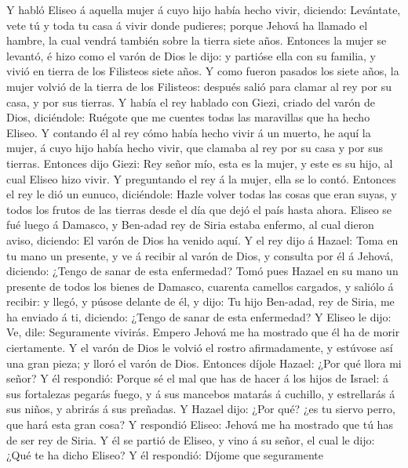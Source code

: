  Y habló Eliseo á aquella mujer á cuyo hijo había hecho
vivir, diciendo: Levántate, vete tú y toda tu casa á vivir donde
pudieres; porque Jehová ha llamado el hambre, la cual vendrá también
sobre la tierra siete años.  Entonces la mujer se levantó, é
hizo como el varón de Dios le dijo: y partióse ella con su familia, y
vivió en tierra de los Filisteos siete años.  Y como fueron
pasados los siete años, la mujer volvió de la tierra de los Filisteos:
después salió para clamar al rey por su casa, y por sus tierras.
 Y había el rey hablado con Giezi, criado del varón de Dios,
diciéndole: Ruégote que me cuentes todas las maravillas que ha hecho
Eliseo.  Y contando él al rey cómo había hecho vivir á un
muerto, he aquí la mujer, á cuyo hijo había hecho vivir, que clamaba al
rey por su casa y por sus tierras. Entonces dijo Giezi: Rey señor mío,
esta es la mujer, y este es su hijo, al cual Eliseo hizo vivir.
 Y preguntando el rey á la mujer, ella se lo contó. Entonces
el rey le dió un eunuco, diciéndole: Hazle volver todas las cosas que
eran suyas, y todos los frutos de las tierras desde el día que dejó el
país hasta ahora.  Eliseo se fué luego á Damasco, y Ben-adad
rey de Siria estaba enfermo, al cual dieron aviso, diciendo: El varón de
Dios ha venido aquí.  Y el rey dijo á Hazael: Toma en tu
mano un presente, y ve á recibir al varón de Dios, y consulta por él á
Jehová, diciendo: ¿Tengo de sanar de esta enfermedad?  Tomó
pues Hazael en su mano un presente de todos los bienes de Damasco,
cuarenta camellos cargados, y saliólo á recibir: y llegó, y púsose
delante de él, y dijo: Tu hijo Ben-adad, rey de Siria, me ha enviado á
ti, diciendo: ¿Tengo de sanar de esta enfermedad?  Y Eliseo
le dijo: Ve, dile: Seguramente vivirás. Empero Jehová me ha mostrado que
él ha de morir ciertamente.  Y el varón de Dios le volvió
el rostro afirmadamente, y estúvose así una gran pieza; y lloró el varón
de Dios.  Entonces díjole Hazael: ¿Por qué llora mi señor?
Y él respondió: Porque sé el mal que has de hacer á los hijos de Israel:
á sus fortalezas pegarás fuego, y á sus mancebos matarás á cuchillo, y
estrellarás á sus niños, y abrirás á sus preñadas.  Y
Hazael dijo: ¿Por qué? ¿es tu siervo perro, que hará esta gran cosa? Y
respondió Eliseo: Jehová me ha mostrado que tú has de ser rey de Siria.
 Y él se partió de Eliseo, y vino á su señor, el cual le
dijo: ¿Qué te ha dicho Eliseo? Y él respondió: Díjome que seguramente
